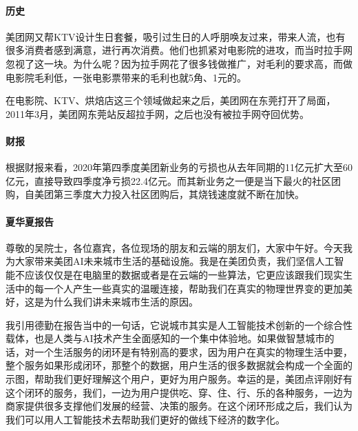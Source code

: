 \documentclass[letterpaper,10pt,english]{sphinxmanual}
\begin{document}
\paragraph{历史}
\label{\detokenize{chapter_AI_company/meituan:id4}}
美团网又帮KTV设计生日套餐，吸引过生日的人呼朋唤友过来，带来人流，也有很多消费者感到满意，进行再次消费。他们也抓紧对电影院的进攻，而当时拉手网忽视了这一块。为什么呢？因为拉手网花了很多钱做推广，对毛利的要求高，而做电影院毛利低，一张电影票带来的毛利也就5角、1元的。

在电影院、KTV、烘焙店这三个领域做起来之后，美团网在东莞打开了局面，2011年3月，美团网东莞站反超拉手网，之后也没有被拉手网夺回优势。


\paragraph{财报}
\label{\detokenize{chapter_AI_company/meituan:id5}}
根据财报来看，2020年第四季度美团新业务的亏损也从去年同期的11亿元扩大至60亿元，直接导致四季度净亏损22.4亿元。而其新业务之一便是当下最火的社区团购，自美团第三季度大力投入社区团购后，其烧钱速度就不断在加快。%
\begin{footnote}[1030]\sphinxAtStartFootnote
{}
%
\end{footnote}


\paragraph{夏华夏报告}
\label{\detokenize{chapter_AI_company/meituan:id6}}
尊敬的吴院士，各位嘉宾，各位现场的朋友和云端的朋友们，大家中午好。今天我为大家带来美团AI未来城市生活的基础设施。我是在美团负责，我们坚信人工智能不应该仅仅是在电脑里的数据或者是在云端的一些算法，它更应该跟我们现实生活中的每一个人产生一些真实的温暖连接，帮助我们在真实的物理世界变的更加美好，这是为什么我们讲未来城市生活的原因。
%
\begin{footnote}[1031]\sphinxAtStartFootnote
{}
%
\end{footnote}

我引用德勤在报告当中的一句话，它说城市其实是人工智能技术创新的一个综合性载体，也是人类与AI技术产生全面感知的一个集中体验地。如果做智慧城市的话，对一个生活服务的闭环是有特别高的要求，因为用户在真实的物理生活中要，整个服务如果形成闭环，那整个的数据，用户生活的很多数据就会构成一个全面的示图，帮助我们更好理解这个用户，更好为用户服务。幸运的是，美团点评刚好有这个闭环的服务，我们，一边为用户提供吃、穿、住、行、乐的各种服务，一边为商家提供很多支撑他们发展的经营、决策的服务。在这个闭环形成之后，我们认为我们可以用人工智能技术去帮助我们更好的做线下经济的数字化。
\end{document}
